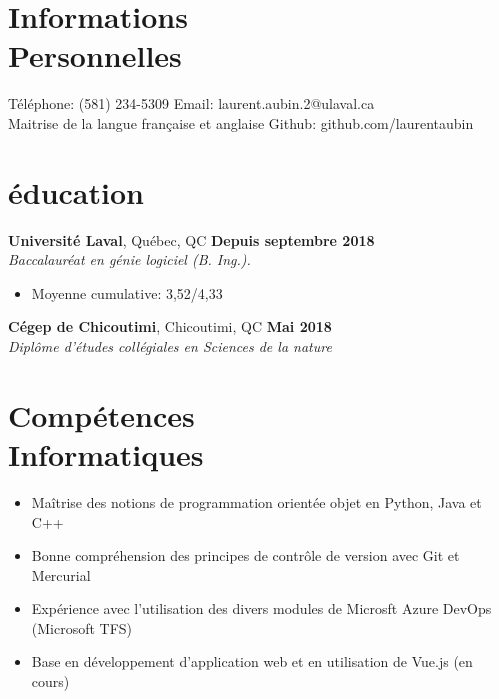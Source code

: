 \documentclass[margin,line]{resume}
\begin{document}
\begin{resume}
    \section{\mysidestyle Informations\\Personnelles}

    Téléphone: (581) 234-5309     \hfill \noindent Email: laurent.aubin.2@ulaval.ca \\
    Maitrise de la langue française et anglaise \hfill \noindent Github: github.com/laurentaubin


    \section{\mysidestyle éducation}

    \textbf{Université Laval}, Québec, QC \hfill \textbf{Depuis septembre 2018} \vspace{2mm}\\\vspace{1mm}%
    \textsl{Baccalauréat en génie logiciel (B. Ing.).}
    \begin{itemize}[nosep]
        \item Moyenne cumulative: 3,52/4,33
    \end{itemize}

      \textbf{Cégep de Chicoutimi}, Chicoutimi, QC \hfill \textbf{Mai 2018} \vspace{2mm}\\\vspace{1mm}%
    \textsl{Diplôme d'études collégiales en Sciences de la nature}


    \section{\mysidestyle Compétences\\Informatiques}
     \begin{itemize}[nosep]
        \item Maîtrise des notions de programmation orientée objet en Python, Java et C++
        \item Bonne compréhension des principes de contrôle de version avec Git et Mercurial
        \item Expérience avec l'utilisation des divers modules de Microsft Azure DevOps (Microsoft TFS)
        \item Base en développement d'application web et en utilisation de Vue.js (en cours)
    \end{itemize}


\end{resume}
\end{document}
